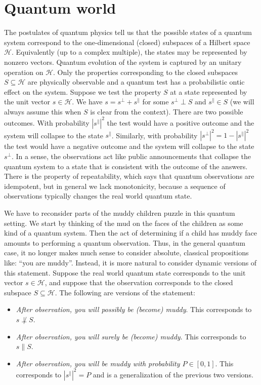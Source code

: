 \documentclass[a4paper]{article}
\newcommand{\HH}{\mathcal{H}}
\begin{document}
\section*{Quantum world}

The postulates of quantum physics tell us that the possible states of a quantum
system correspond to the one-dimensional (closed) subspaces of a Hilbert space
$\HH$. Equivalently (up to a complex multiple), the states may be represented by
nonzero vectors. Quantum evolution of the system is captured by an unitary
operation on $\HH$. Only the properties corresponding to the closed subspaces $S
\subseteq \HH$ are physically observable and a quantum test has a probabilistic
ontic effect on the system. Suppose we test the property $S$ at a state
represented by the unit vector $s \in \HH$. We have $s = s^{\perp} +
s^{\parallel}$ for some $s^{\perp} \perp S$ and $s^{\parallel} \in S$ (we will
always assume this when $S$ is clear from the context). There are
two possible outcomes. With probability $|s^{\parallel}|^2$ the test would have
a positive outcome and the system will collapse to the state $s^{\parallel}$.
Similarly, with probability $|s^{\perp}|^2 = 1 - |s^{\parallel}|^2$ the test
would have a negative outcome and the system will collapse to the state
$s^{\perp}$. In a sense, the observations act like public announcements that
collapse the quantum system to a state that is consistent with the outcome of
the answers. There is the property of repeatability, which says that quantum
observations are idempotent, but in general we lack monotonicity, because a
sequence of observations typically changes the real world quantum state.

We have to reconsider parts of the muddy children puzzle in this quantum
setting. We start by thinking of the mud on the faces of the children as some
kind of a quantum system. Then the act of determining if a child has muddy face
amounts to performing a quantum observation. Thus, in the general quantum case, 
it no longer makes much sense to consider absolute, classical propositions like:
``you are muddy''. Instead, it is more natural to consider dynamic
versions of this statement. 
Suppose the real world quantum state corresponds to the unit vector $s \in \HH$,
and suppose that the observation corresponds to the closed subspace $S \subseteq
\HH$. The following are versions of the statement:
\begin{itemize}
\item \emph{After observation, you will possibly be (become) muddy}. This
    corresponds to $s \not\perp S$.
\item \emph{After observation, you will surely be (become) muddy}. This
    corresponds to $s \parallel S$.
\item \emph{After observation, you will be muddy with probability $P \in [0,
    1]$}. This corresponds to $|s^{\parallel}|^2 = P$ and is a generalization of
    the previous two versions.
\end{itemize}
\end{document}
